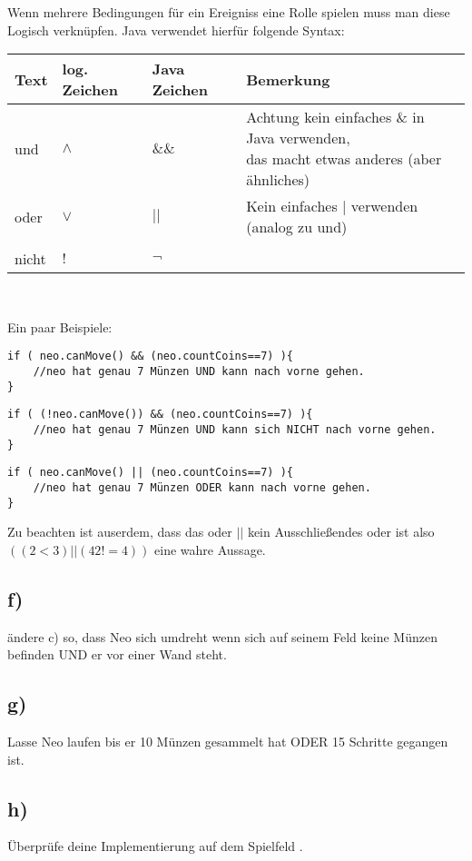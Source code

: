 \begin{Infobox}
Wenn mehrere Bedingungen für ein Ereigniss eine Rolle spielen muss man diese Logisch verknüpfen. Java verwendet hierfür folgende Syntax:
\begin{center}
        \begin{tabular}{ l | l | l | l}
            Text & log. Zeichen & Java Zeichen &Bemerkung \\
            \hline
            und  &$\land$& $\&\&$& \minibox{Achtung kein einfaches \& in Java verwenden,\\ das macht etwas anderes (aber ähnliches)} \\
            oder  &$\lor$& $||$& Kein einfaches $|$ verwenden (analog zu und) \\
            & &  \\

            nicht & $!$&$\neg$ &\\
    \end{tabular}\\
\end{center}
Ein paar Beispiele:
\begin{lstlisting}
if ( neo.canMove() && (neo.countCoins==7) ){
	//neo hat genau 7 Münzen UND kann nach vorne gehen.
}
\end{lstlisting}

\begin{lstlisting}
if ( (!neo.canMove()) && (neo.countCoins==7) ){
	//neo hat genau 7 Münzen UND kann sich NICHT nach vorne gehen.
}
\end{lstlisting}

\begin{lstlisting}
if ( neo.canMove() || (neo.countCoins==7) ){
	//neo hat genau 7 Münzen ODER kann nach vorne gehen.
}
\end{lstlisting}
Zu beachten ist auserdem, dass das oder $||$ kein Ausschließendes oder ist also\\ $((2 < 3) || (42 != 4))$ eine wahre Aussage.
\end{Infobox}
	\subsection*{f)}
	ändere c) so, dass Neo sich umdreht wenn sich auf seinem Feld keine Münzen befinden UND er vor einer Wand steht.

\subsection*{g)}
Lasse Neo laufen bis er 10 Münzen gesammelt hat ODER 15 Schritte gegangen ist.

\subsection*{h)}
Überprüfe deine Implementierung auf dem Spielfeld .


